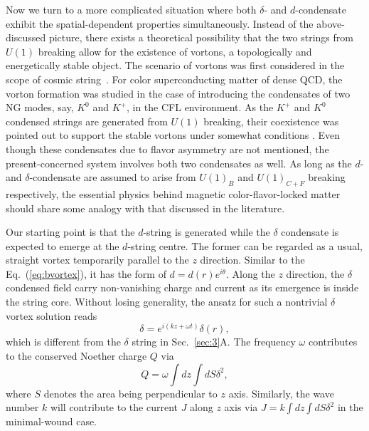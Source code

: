 \documentclass[prd, showpacs,nofootinbib,amsmath,amssymb]{revtex4}
\begin{document}
Now we turn to a more complicated situation where both $\delta$- and $d$-condensate exhibit the
spatial-dependent properties simultaneously. Instead of the above-discussed picture, there exists a
theoretical possibility that the two strings from $U(1)$ breaking allow for the existence of vortons,
a topologically and energetically stable object. The scenario of vortons was first considered in the
scope of cosmic
string~\cite{vilenkin2000cosmic,witten1985superconducting,davis1988physics1,davis1988physics2,haws1988superconducting}.
For color superconducting matter of dense QCD, the vorton formation was studied in the case of introducing the
condensates of two NG modes, say, $K^0$ and $K^+$, in the CFL environment. As the $K^+$ and $K^0$ condensed strings are generated from $U(1)$ breaking, their coexistence was pointed out to support the stable vortons under somewhat conditions \cite{kaplan2002charged,buckley2002superconducting}. 
Even though these condensates due to flavor asymmetry are not mentioned, the present-concerned system involves both two condensates as well. As long as the $d$- and
$\delta$-condensate are assumed to arise from $U(1)_B$ and $U(1)_{C+F}$ breaking respectively, the essential physics
behind magnetic color-flavor-locked matter should share some analogy with that discussed in the literature.
%

Our starting point is that the $d$-string is generated while the $\delta$ condensate is expected to emerge
at the $d$-string centre. The former can be regarded as a usual, straight vortex temporarily parallel to the
$z$ direction. Similar to the Eq.~(\ref{eq:bvortex}), it has the form of $d = d(r)e^{i\theta}$.
Along the $z$ direction, the $\delta$ condensed field carry non-vanishing charge and current as its emergence
is inside the string core. Without losing generality, the ansatz for such a nontrivial $\delta$ vortex solution reads
\begin{equation}
  \label{eq:delta}
  \delta =  e^{i(kz+\omega t)}\delta(r),
\end{equation}
which is different from the $\delta$ string in Sec.~\ref{sec:3}A. The frequency $\omega$ contributes to the conserved
Noether charge $Q$ via
 \begin{equation}
  \label{eq:vortonquantumq}
   Q = \omega\int dz \int dS \delta^2,
 \end{equation}
where $S$ denotes the area being perpendicular to $z$ axis. Similarly, the wave number $k$ will contribute to the
current $J$ along $z$ axis via $J =k\int dz \int dS \delta^2$ in the minimal-wound case.
\end{document}
